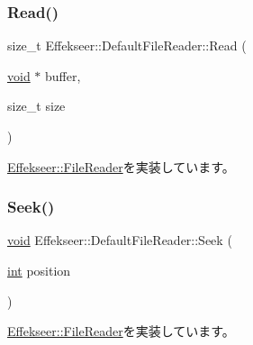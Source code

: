 \mbox{\label{class_effekseer_1_1_default_file_reader_ae00fd8b1031e13bd5a43d74f03d7ed79}} 
\subsubsection{\texorpdfstring{Read()}{Read()}}
{\footnotesize\ttfamily size\+\_\+t Effekseer\+::\+Default\+File\+Reader\+::\+Read (\begin{DoxyParamCaption}\item[{\mbox{\hyperlink{namespace_effekseer_ab34c4088e512200cf4c2716f168deb56}{void}} $\ast$}]{buffer,  }\item[{size\+\_\+t}]{size }\end{DoxyParamCaption})\hspace{0.3cm}{\ttfamily [virtual]}}



\mbox{\hyperlink{class_effekseer_1_1_file_reader_a6274b775770e8ac9ba4f212c80e94be1}{Effekseer\+::\+File\+Reader}}を実装しています。

\mbox{\label{class_effekseer_1_1_default_file_reader_a9c9e821e4508708a2c91a9ab486b2709}} 
\subsubsection{\texorpdfstring{Seek()}{Seek()}}
{\footnotesize\ttfamily \mbox{\hyperlink{namespace_effekseer_ab34c4088e512200cf4c2716f168deb56}{void}} Effekseer\+::\+Default\+File\+Reader\+::\+Seek (\begin{DoxyParamCaption}\item[{\mbox{\hyperlink{namespace_effekseer_ace0abf7c2e6947e519ebe8b54cbcc30a}{int}}}]{position }\end{DoxyParamCaption})\hspace{0.3cm}{\ttfamily [virtual]}}



\mbox{\hyperlink{class_effekseer_1_1_file_reader_a5daeb98049f994bccf874b2374e36a25}{Effekseer\+::\+File\+Reader}}を実装しています。



